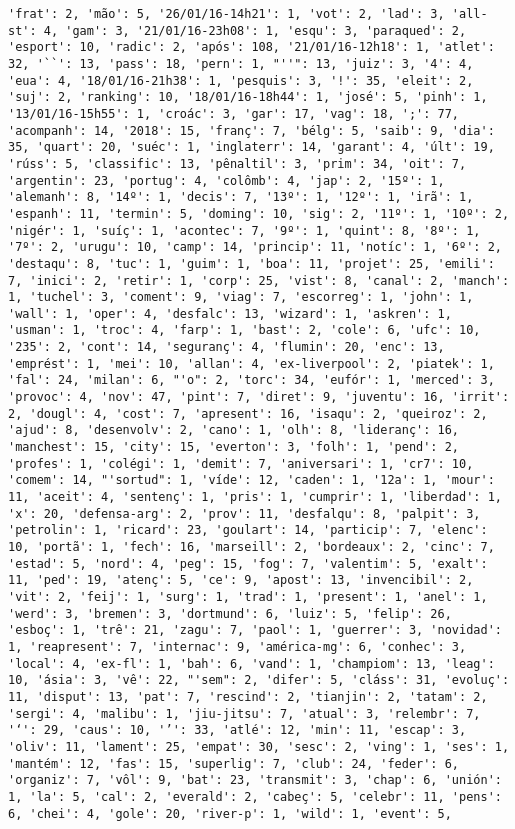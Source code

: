 \documentclass[11pt]{article}
\begin{document}
\begin{Verbatim}[commandchars=\\\{\}]
'frat': 2, 'mão': 5, '26/01/16-14h21': 1, 'vot': 2, 'lad': 3, 'all-st': 4, 'gam': 3, '21/01/16-23h08': 1, 'esqu': 3, 'paraqued': 2, 'esport': 10, 'radic': 2, 'após': 108, '21/01/16-12h18': 1, 'atlet': 32, '``': 13, 'pass': 18, 'pern': 1, "''": 13, 'juiz': 3, '4': 4, 'eua': 4, '18/01/16-21h38': 1, 'pesquis': 3, '!': 35, 'eleit': 2, 'suj': 2, 'ranking': 10, '18/01/16-18h44': 1, 'josé': 5, 'pinh': 1, '13/01/16-15h55': 1, 'croác': 3, 'gar': 17, 'vag': 18, ';': 77, 'acompanh': 14, '2018': 15, 'franç': 7, 'bélg': 5, 'saib': 9, 'dia': 35, 'quart': 20, 'suéc': 1, 'inglaterr': 14, 'garant': 4, 'últ': 19, 'rúss': 5, 'classific': 13, 'pênaltil': 3, 'prim': 34, 'oit': 7, 'argentin': 23, 'portug': 4, 'colômb': 4, 'jap': 2, '15º': 1, 'alemanh': 8, '14º': 1, 'decis': 7, '13º': 1, '12º': 1, 'irã': 1, 'espanh': 11, 'termin': 5, 'doming': 10, 'sig': 2, '11º': 1, '10º': 2, 'nigér': 1, 'suíç': 1, 'acontec': 7, '9º': 1, 'quint': 8, '8º': 1, '7º': 2, 'urugu': 10, 'camp': 14, 'princip': 11, 'notíc': 1, '6º': 2, 'destaqu': 8, 'tuc': 1, 'guim': 1, 'boa': 11, 'projet': 25, 'emili': 7, 'inici': 2, 'retir': 1, 'corp': 25, 'vist': 8, 'canal': 2, 'manch': 1, 'tuchel': 3, 'coment': 9, 'viag': 7, 'escorreg': 1, 'john': 1, 'wall': 1, 'oper': 4, 'desfalc': 13, 'wizard': 1, 'askren': 1, 'usman': 1, 'troc': 4, 'farp': 1, 'bast': 2, 'cole': 6, 'ufc': 10, '235': 2, 'cont': 14, 'seguranç': 4, 'flumin': 20, 'enc': 13, 'emprést': 1, 'mei': 10, 'allan': 4, 'ex-liverpool': 2, 'piatek': 1, 'fal': 24, 'milan': 6, "'o": 2, 'torc': 34, 'eufór': 1, 'merced': 3, 'provoc': 4, 'nov': 47, 'pint': 7, 'diret': 9, 'juventu': 16, 'irrit': 2, 'dougl': 4, 'cost': 7, 'apresent': 16, 'isaqu': 2, 'queiroz': 2, 'ajud': 8, 'desenvolv': 2, 'cano': 1, 'olh': 8, 'lideranç': 16, 'manchest': 15, 'city': 15, 'everton': 3, 'folh': 1, 'pend': 2, 'profes': 1, 'colégi': 1, 'demit': 7, 'aniversari': 1, 'cr7': 10, 'comem': 14, "'sortud": 1, 'víde': 12, 'caden': 1, '12a': 1, 'mour': 11, 'aceit': 4, 'sentenç': 1, 'pris': 1, 'cumprir': 1, 'liberdad': 1, 'x': 20, 'defensa-arg': 2, 'prov': 11, 'desfalqu': 8, 'palpit': 3, 'petrolin': 1, 'ricard': 23, 'goulart': 14, 'particip': 7, 'elenc': 10, 'portã': 1, 'fech': 16, 'marseill': 2, 'bordeaux': 2, 'cinc': 7, 'estad': 5, 'nord': 4, 'peg': 15, 'fog': 7, 'valentim': 5, 'exalt': 11, 'ped': 19, 'atenç': 5, 'ce': 9, 'apost': 13, 'invencibil': 2, 'vit': 2, 'feij': 1, 'surg': 1, 'trad': 1, 'present': 1, 'anel': 1, 'werd': 3, 'bremen': 3, 'dortmund': 6, 'luiz': 5, 'felip': 26, 'esboç': 1, 'trê': 21, 'zagu': 7, 'paol': 1, 'guerrer': 3, 'novidad': 1, 'reapresent': 7, 'internac': 9, 'américa-mg': 6, 'conhec': 3, 'local': 4, 'ex-fl': 1, 'bah': 6, 'vand': 1, 'champiom': 13, 'leag': 10, 'ásia': 3, 'vê': 22, "'sem": 2, 'difer': 5, 'cláss': 31, 'evoluç': 11, 'disput': 13, 'pat': 7, 'rescind': 2, 'tianjin': 2, 'tatam': 2, 'sergi': 4, 'malibu': 1, 'jiu-jitsu': 7, 'atual': 3, 'relembr': 7, '‘': 29, 'caus': 10, '’': 33, 'atlé': 12, 'min': 11, 'escap': 3, 'oliv': 11, 'lament': 25, 'empat': 30, 'sesc': 2, 'ving': 1, 'ses': 1, 'mantém': 12, 'fas': 15, 'superlig': 7, 'club': 24, 'feder': 6, 'organiz': 7, 'vôl': 9, 'bat': 23, 'transmit': 3, 'chap': 6, 'unión': 1, 'la': 5, 'cal': 2, 'everald': 2, 'cabeç': 5, 'celebr': 11, 'pens': 6, 'chei': 4, 'gole': 20, 'river-p': 1, 'wild': 1, 'event': 5, 
\end{Verbatim}
\end{document}
